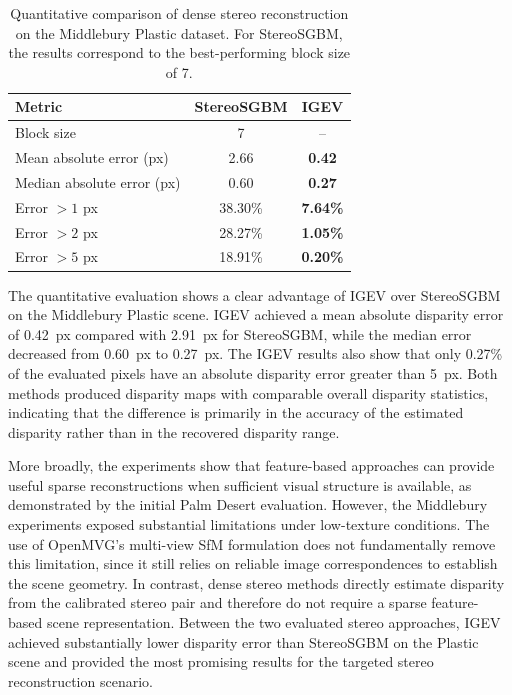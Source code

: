\begin{table}[H]
    \centering
    \caption{Quantitative comparison of dense stereo reconstruction on the
    Middlebury Plastic dataset. For StereoSGBM, the results correspond to
    the best-performing block size of 7.}
    \label{tab:stereo_comparison}
    \begin{tabular}{lcc}
        \hline
        \textbf{Metric} & \textbf{StereoSGBM} & \textbf{IGEV} \\
        \hline
        Block size & 7 & -- \\
        Mean absolute error (px) & 2.66 & \textbf{0.42} \\
        Median absolute error (px) & 0.60 & \textbf{0.27} \\
        Error $>1$ px & 38.30\% & \textbf{7.64\%} \\
        Error $>2$ px & 28.27\% & \textbf{1.05\%} \\
        Error $>5$ px & 18.91\% & \textbf{0.20\%} \\
        \hline
    \end{tabular}
\end{table}

The quantitative evaluation shows a clear advantage of IGEV over
StereoSGBM on the Middlebury Plastic scene. IGEV achieved a mean absolute
disparity error of 0.42~px compared with 2.91~px for StereoSGBM, while the
median error decreased from 0.60~px to 0.27~px. The IGEV results also show
that only 0.27\% of the evaluated pixels have an absolute disparity error
greater than 5~px. Both methods produced disparity maps with comparable
overall disparity statistics, indicating that the difference is primarily
in the accuracy of the estimated disparity rather than in the recovered
disparity range.

More broadly, the experiments show that feature-based approaches can
provide useful sparse reconstructions when sufficient visual structure is
available, as demonstrated by the initial Palm Desert evaluation.
However, the Middlebury experiments exposed substantial limitations under
low-texture conditions. The use of OpenMVG's multi-view SfM formulation
does not fundamentally remove this limitation, since it still relies on
reliable image correspondences to establish the scene geometry. In
contrast, dense stereo methods directly estimate disparity from the
calibrated stereo pair and therefore do not require a sparse
feature-based scene representation. Between the two evaluated stereo
approaches, IGEV achieved substantially lower disparity error than
StereoSGBM on the Plastic scene and provided the most promising results
for the targeted stereo reconstruction scenario.

